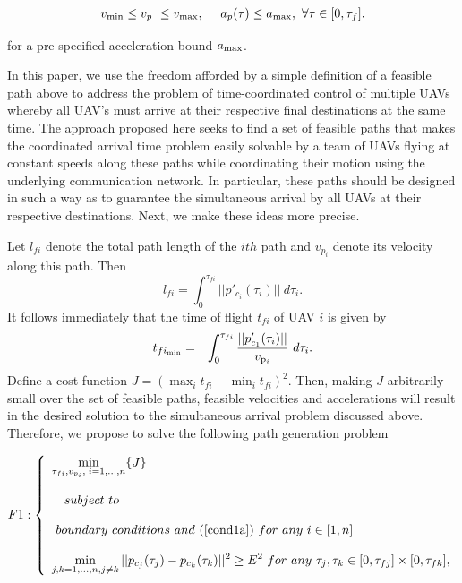 \documentclass[]{aiaa-tc}%
\begin{document}
\begin{eqnarray} \label{cond1a}
v_{\rm min} \le v_p ~ \le v_{\rm max}, ~~~~ a_p(\tau) \le a_{\rm max},
~ \forall \tau \in [0,\tau_f].
\end{eqnarray}

\noindent for a pre-specified acceleration bound $a_{\rm max}$.

In this paper, we use the freedom afforded by a simple definition of a feasible path above to address the
problem of
time-coordinated control of multiple UAVs whereby all UAV's must arrive at their
respective final destinations at the same time.  The approach proposed here seeks to find a set of feasible
paths that makes the coordinated arrival time problem easily solvable by a team of UAVs flying at constant
speeds along these paths while coordinating their motion using the underlying communication network. In
particular, these paths should be designed in such a way as to guarantee the simultaneous arrival by all UAVs
at their respective destinations. Next, we make these ideas more precise.

Let $l_{fi}$ denote the total path length of the $ith$ path and
$v_{p_i}$ denote its velocity along this path. Then
$$
l_{fi}=\int^{\tau_{fi}}_0 ||p'_{c_i}(\tau_i)|| ~ d \tau_i.
$$
It follows immediately that the time of flight $t_{fi}$ of UAV $i$ is given by
\begin{eqnarray} \nonumber t_{fi_{{\rm min}}} &=&
\int^{\tau_{fi}}_0 \frac{||p'_{c_1}(\tau_i)||} {v_{{\rm p}_{i}}}~ d \tau_i .
\end{eqnarray}
Define a cost function $J = (\max_i t_{fi} - \min_i t_{fi})^2$. Then, making $J$ arbitrarily small over the
set of feasible paths, feasible velocities and accelerations  will
result in the desired solution to the simultaneous arrival problem
discussed above. Therefore, we propose to solve the following
path generation problem

\begin{eqnarray}
F1: \left\{
\begin{array}{llll}
\displaystyle{\min_{\tau_{fi},v_{p_i}, \; i =1,\ldots,n} \{ J  \} } \\ \\
~~ ~ subject ~
to \\ \\
~ boundary ~ conditions ~ and ~(\ref{cond1a}) ~ for~ any ~ i
\in [1,n] \\ \\
\displaystyle{\min_{j,k = 1, \ldots, n, j \ne k} ||
p_{c_j}(\tau_j) - p_{c_k}(\tau_k)||^2 \ge E^2 ~ for ~ any ~
\tau_j, \tau_k \in [0,
\tau_{fj}] \times [0, \tau_{fk}]},
\end{array} \right.
\end{eqnarray}
\end{document}
